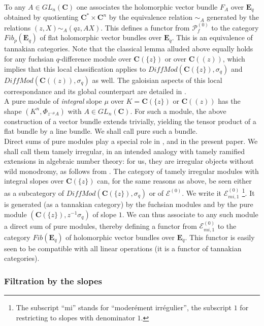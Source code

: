 \documentclass[english]{smfart}
\numberwithin{equation}{thm}
\def\sq{\sigma_q}
\def\C{{\mathbf C}}
\def\P{{\mathcal{P}}}
\def\Eq{{\mathbf{E}_{q}}}
\def\EE{{\mathcal{E}}}
\def\Ka{{\C(\{z\})}}
\def\Kf{{\C((z))}}
\def\DMa{{DiffMod(\Ka,\sq)}}
\def\DMf{{DiffMod(\Kf,\sq)}}
\begin{document}
To any $A \in GL_{n}(\C)$ one associates the holomorphic vector bundle 
$F_{A}$ over $\Eq$ obtained by quotienting $\C^{*} \times \C^{n}$ 
by the equivalence relation $\sim_{A}$ generated by the relations 
$(z,X) \sim_{A} (qz,AX)$. This defines a functor from $\P_{f}^{(0)}$ 
to the category $Fib_{p}(\Eq)$ of flat holomorphic vector bundles over 
$\Eq$. This is an equivalence of tannakian categories. 
Note that the classical lemma alluded above equally holds for any 
fuchsian $q$-difference module over $\Ka$ or over $\Kf$, which implies 
that this local classification applies to $\DMa$ and $\DMf$ as well. 
The galoisian aspects of this local correspondance and its global 
counterpart are detailed in \cite{JSGAL}. \\

A pure module of \emph{integral} slope $\mu$ over $K = \Ka$ or $\Kf$
has the shape $(K^{n}, \Phi_{z^{-\mu} A})$ with $A \in GL_{n}(\C)$.
For such a module, the above construction of a vector bundle extends
trivially, yielding the tensor product of a flat bundle by a line
bundle. We shall call pure such a bundle. \\

Direct sums of pure modules play a special role in \cite{JSFIL},
\cite{RSZ} and in the present paper. We shall call them tamely
irregular, in an intended analogy with tamely ramified extensions
in algebraic number theory: for us, they are irregular objects without
wild monodromy, as follows from \cite{RSZ}. The category of 
tamely irregular modules with integral slopes over $\Ka$ can,
for the same reasons as above, be seen either as a subcategory
of $\DMa$ or of $\EE^{(0)}$. We write it $\EE_{mi,1}^{(0)}$
\footnote{The subscript ``mi'' stands for ``moder\'ement 
irr\'egulier'', the subscript $1$ for restricting to slopes
with denominator $1$.}.
It is generated (as a tannakian category) by the fuchsian modules
and by the pure module $(\Ka,z^{-1} \sq)$ of slope $1$. We can thus
associate to any such module a direct sum of pure modules, thereby
defining a functor from $\EE_{mi,1}^{(0)}$ to the category $Fib(\Eq)$ 
of holomorphic vector bundles over $\Eq$. This functor is easily seen
to be compatible with all linear operations (it is  a functor of 
tannakian categories). \\


\subsubsection*{Filtration by the slopes}
\end{document}
